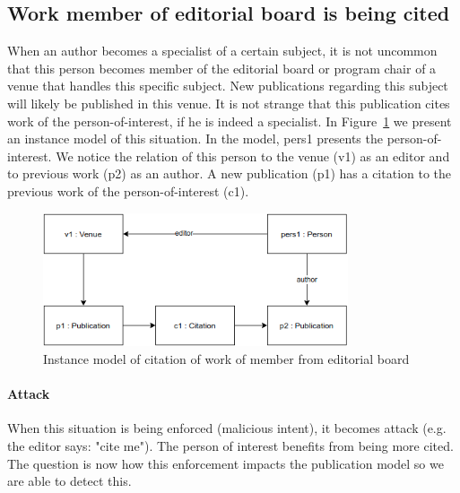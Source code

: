 \documentclass{ou-report}
\begin{document}
\subsection{Work member of editorial board is being cited}
\label{sec:work_member_editorial_board_cited}
When an author becomes a specialist of a certain subject, it is not uncommon 
that this person becomes member of the editorial board or program chair of a 
venue that handles this specific subject.
New publications regarding this subject will likely be published in this venue. 
It is not strange that this publication cites work of the person-of-interest, if 
he is indeed a specialist.
In Figure~\ref{fig:cweb} we present an instance model of this situation. In the 
model, pers1 presents the person-of-interest. We notice the relation of this 
person to the venue (v1) as an editor and to previous work (p2) as an author. A 
new publication (p1) has a 
citation to the previous work of the person-of-interest (c1).

\begin{figure}[H]
\centering
\includegraphics[width=9cm]{images/cite_work_editorial_board.drawio.png}
\caption{Instance model of citation of work of member from editorial board}
\label{fig:cweb}
\end{figure}

\paragraph{Attack} When this situation is being enforced (malicious intent), it 
becomes attack (e.g. the editor says: "cite me"). The person of interest benefits 
from being more cited. The question is now how this enforcement impacts the 
publication model so we are able to detect this. 

\end{document}
